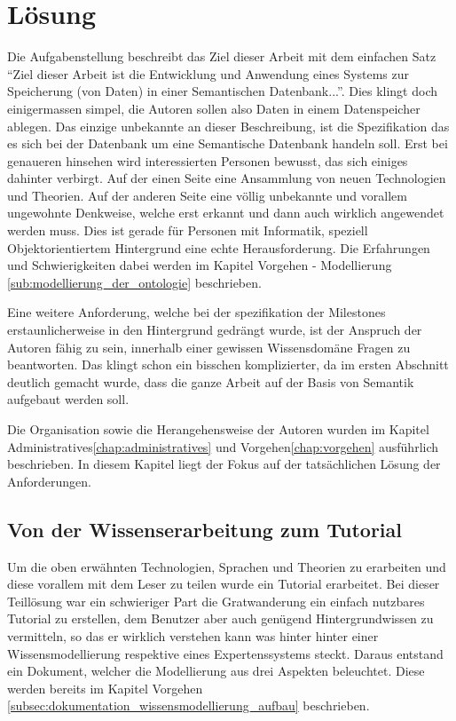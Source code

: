 \chapter{Lösung}
\label{chap:loesung}
Die Aufgabenstellung beschreibt das Ziel dieser Arbeit mit dem einfachen Satz "`Ziel dieser Arbeit ist die Entwicklung und Anwendung eines Systems zur Speicherung (von Daten) in einer Semantischen Datenbank..."'.  Dies klingt doch einigermassen simpel, die Autoren sollen also Daten in einem Datenspeicher ablegen. Das einzige unbekannte an dieser Beschreibung, ist die Spezifikation das es sich bei der Datenbank um eine Semantische Datenbank handeln soll. Erst bei genaueren hinsehen wird interessierten Personen bewusst, das sich einiges dahinter verbirgt. Auf der einen Seite eine Ansammlung von neuen Technologien und Theorien. Auf der anderen Seite eine völlig unbekannte und vorallem ungewohnte Denkweise, welche erst erkannt und dann auch wirklich angewendet werden muss. Dies ist gerade für Personen mit Informatik, speziell Objektorientiertem Hintergrund eine echte Herausforderung. Die Erfahrungen und Schwierigkeiten dabei werden im Kapitel Vorgehen - Modellierung \ref{sub:modellierung_der_ontologie} beschrieben.

Eine weitere Anforderung, welche bei der spezifikation der Milestones erstaunlicherweise in den Hintergrund gedrängt wurde, ist der Anspruch der Autoren fähig zu sein, innerhalb einer gewissen Wissensdomäne Fragen zu beantworten. Das klingt schon ein bisschen komplizierter, da im ersten Abschnitt deutlich gemacht wurde, dass die ganze Arbeit auf der Basis von Semantik aufgebaut werden soll. 

Die Organisation sowie die Herangehensweise der Autoren wurden im Kapitel Administratives\ref{chap:administratives} und Vorgehen\ref{chap:vorgehen} ausführlich beschrieben. In diesem Kapitel liegt der Fokus auf der tatsächlichen Lösung der Anforderungen.


\section{Von der Wissenserarbeitung zum Tutorial}
\label{sec:loesung_tutorial}
Um die oben erwähnten Technologien, Sprachen und Theorien zu erarbeiten und diese vorallem mit dem Leser zu teilen wurde ein Tutorial erarbeitet. Bei dieser Teillösung war ein schwieriger Part die Gratwanderung ein einfach nutzbares Tutorial zu erstellen, dem Benutzer aber auch genügend Hintergrundwissen zu vermitteln, so das er wirklich verstehen kann was hinter hinter einer Wissensmodellierung respektive eines Expertenssystems steckt. Daraus entstand ein Dokument, welcher die Modellierung aus drei Aspekten beleuchtet. Diese werden bereits im Kapitel Vorgehen \ref{subsec:dokumentation_wissensmodellierung_aufbau} beschrieben.

